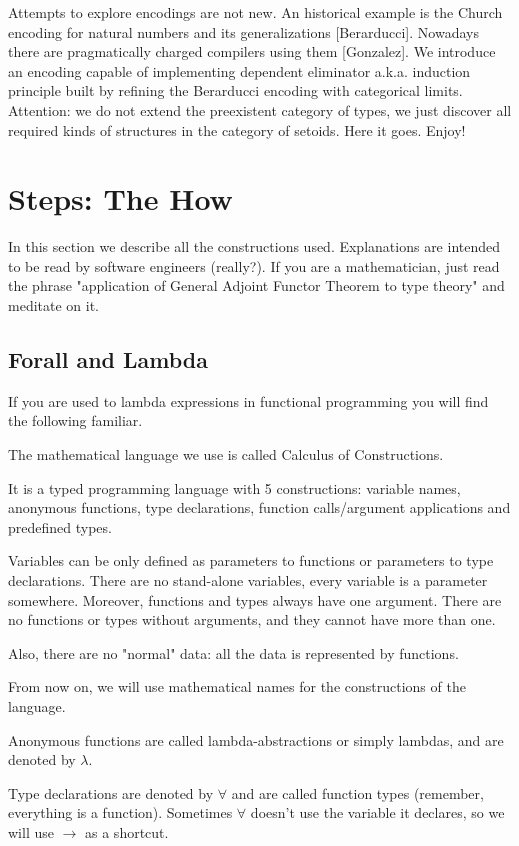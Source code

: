 \documentclass[11pt,oneside]{article}
\begin{document}
Attempts to explore encodings are not new. An historical example is the
Church encoding for natural numbers and its generalizations [Berarducci].
Nowadays there are pragmatically charged compilers using them [Gonzalez].
We introduce an encoding capable of implementing dependent eliminator a.k.a.
induction principle built by refining the Berarducci encoding with categorical limits.
Attention: we do not extend the preexistent category of types,
we just discover all required kinds of structures in the category of setoids.
Here it goes. Enjoy!

\newpage
\section{Steps: The How}

In this section we describe all the constructions used.
Explanations are intended to be read by software engineers (really?).
If you are a mathematician, just read the phrase
"application of General Adjoint Functor Theorem to type theory" and meditate on it.

\subsection{Forall and Lambda}

If you are used to lambda expressions in functional programming
you will find the following familiar.

The mathematical language we use is called Calculus of Constructions.

It is a typed programming language with 5 constructions: variable names, anonymous functions,
type declarations, function calls/argument applications and predefined types.

Variables can be only defined as parameters to functions or parameters to type declarations. 
There are no stand-alone variables, every variable is a parameter somewhere. Moreover,
functions and types always have one argument. There are no functions or types without arguments,
and they cannot have more than one.

Also, there are no "normal" data: all the data is represented by functions.

From now on, we will use mathematical names for the constructions of the language.

Anonymous functions are called lambda-abstractions or simply lambdas,
and are denoted by  $\lambda$. 

Type declarations are denoted by $\forall$ and are called function types 
(remember, everything is a function). Sometimes $\forall$ doesn't use the variable it declares,
so we will use $\rightarrow$ as a shortcut.
\end{document}
